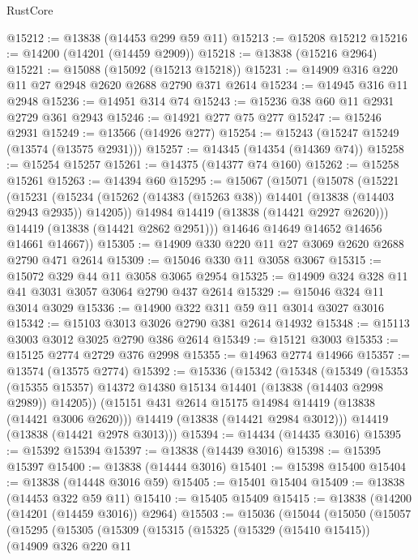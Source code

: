 \begin{lexlean}{RustCore}
\begin{coremodule}
@15212 := @13838 (@14453 @299 @59 @11)
@15213 := @15208 @15212
@15216 := @14200 (@14201 (@14459 @2909))
@15218 := @13838 (@15216 @2964)
@15221 := @15088 (@15092 (@15213 @15218))
@15231 := @14909 @316 @220 @11 @27 @2948 @2620 @2688 @2790 @371 @2614
@15234 := @14945 @316 @11 @2948
@15236 := @14951 @314 @74
@15243 := @15236 @38 @60 @11 @2931 @2729 @361 @2943
@15246 := @14921 @277 @75 @277
@15247 := @15246 @2931
@15249 := @13566 (@14926 @277)
@15254 := @15243 (@15247 @15249 (@13574 (@13575 @2931)))
@15257 := @14345 (@14354 (@14369 @74))
@15258 := @15254 @15257
@15261 := @14375 (@14377 @74 @160)
@15262 := @15258 @15261
@15263 := @14394 @60
@15295 := @15067
    (@15071
      (@15078
        (@15221
          (@15231
            (@15234 (@15262 (@14383 (@15263 @38)) @14401 (@13838 (@14403 @2943 @2935)) @14205))
            @14984
            @14419
            (@13838 (@14421 @2927 @2620)))
          @14419
          (@13838 (@14421 @2862 @2951)))
        @14646
        @14649
        @14652
        @14656
        @14661
        @14667))
@15305 := @14909 @330 @220 @11 @27 @3069 @2620 @2688 @2790 @471 @2614
@15309 := @15046 @330 @11 @3058 @3067
@15315 := @15072 @329 @44 @11 @3058 @3065 @2954
@15325 := @14909 @324 @328 @11 @41 @3031 @3057 @3064 @2790 @437 @2614
@15329 := @15046 @324 @11 @3014 @3029
@15336 := @14900 @322 @311 @59 @11 @3014 @3027 @3016
@15342 := @15103 @3013 @3026 @2790 @381 @2614 @14932
@15348 := @15113 @3003 @3012 @3025 @2790 @386 @2614
@15349 := @15121 @3003
@15353 := @15125 @2774 @2729 @376 @2998
@15355 := @14963 @2774 @14966
@15357 := @13574 (@13575 @2774)
@15392 := @15336
    (@15342
      (@15348
        (@15349
          (@15353 (@15355 @15357) @14372 @14380 @15134 @14401 (@13838 (@14403 @2998 @2989)) @14205))
        (@15151 @431 @2614 @15175 @14984 @14419 (@13838 (@14421 @3006 @2620)))
        @14419
        (@13838 (@14421 @2984 @3012)))
      @14419
      (@13838 (@14421 @2978 @3013)))
@15394 := @14434 (@14435 @3016)
@15395 := @15392 @15394
@15397 := @13838 (@14439 @3016)
@15398 := @15395 @15397
@15400 := @13838 (@14444 @3016)
@15401 := @15398 @15400
@15404 := @13838 (@14448 @3016 @59)
@15405 := @15401 @15404
@15409 := @13838 (@14453 @322 @59 @11)
@15410 := @15405 @15409
@15415 := @13838 (@14200 (@14201 (@14459 @3016)) @2964)
@15503 := @15036
    (@15044
      (@15050
        (@15057
          (@15295
            (@15305
              (@15309
                (@15315
                  (@15325
                    (@15329 (@15410 @15415))
                    (@14909
                      @326
                      @220
                      @11

\end{coremodule}
\end{lexlean}
